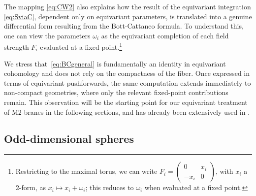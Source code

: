 \documentclass[11pt,a4paper]{article}
\theoremstyle{definition}
\theoremstyle{identity}
\theoremstyle{remark}
\begin{document}
The mapping \eqref{eq:CW2} also explains how the result of the equivariant integration \eqref{eq:SviaC}, dependent only on equivariant parameters, is translated into a genuine differential form resulting from the Bott-Cattaneo formula. To understand this, one can view the parameters $\omega_i$ as the equivariant completion of each field strength $F_i$ evaluated at a fixed point.\footnote{Restricting to the maximal torus, we can write $F_i=\begin{pmatrix} 0&x_i\\ -x_i & 0\end{pmatrix}$, with $x_i$ a 2-form, as $x_i\mapsto x_i+\omega_i$; this reduces to $\omega_i$ when evaluated at a fixed point.}

We stress that~\eqref{eq:BCgeneral} is fundamentally an identity in equivariant cohomology and
does not rely on the compactness of the fiber. Once expressed in terms of equivariant
pushforwards, the same computation extends immediately to non-compact geometries, where only the
relevant fixed-point contributions remain. This observation will be the starting point for our
equivariant treatment of M2-branes in the following sections, and has already been extensively used in \cite{Hosseini:2020vgl}.

\subsection{Odd-dimensional spheres}
\label{subsec:odd}
\end{document}
